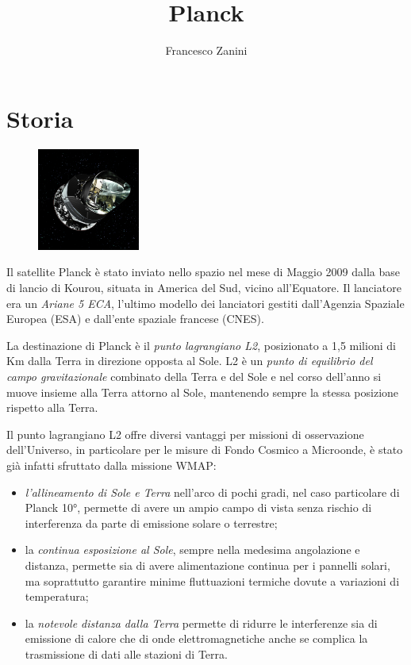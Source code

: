 \documentclass[12pt,a4paper]{article}
\begin{document}
\title{\vspace{-70pt}Planck}
\author{Francesco Zanini}
\date{}
\maketitle
\pagestyle{empty}
\thispagestyle{empty}

\section*{Storia}
\begin{figure}
  \vspace{-10pt}
  \begin{center}
    \includegraphics[width=0.30\textwidth]{satellite}
  \end{center}
  \vspace{-20pt}
\end{figure}
Il satellite Planck è stato inviato nello spazio nel mese di Maggio 2009 dalla base di lancio di Kourou, situata in America del Sud, vicino all'Equatore. Il lanciatore era un \emph{Ariane 5 ECA}, l'ultimo modello dei lanciatori gestiti dall'Agenzia Spaziale Europea (ESA) e dall'ente spaziale francese (CNES).

La destinazione di Planck è il \emph{punto lagrangiano L2}, posizionato a 1,5 milioni di Km dalla Terra in direzione opposta al Sole. L2 è un \emph{punto di equilibrio del campo gravitazionale} combinato della Terra e del Sole e nel corso dell'anno si muove insieme alla Terra attorno al Sole, mantenendo sempre la stessa posizione rispetto alla Terra.

Il punto lagrangiano L2 offre diversi vantaggi per missioni di osservazione dell'Universo, in particolare per le misure di Fondo Cosmico a Microonde, è stato già infatti sfruttato dalla missione WMAP:
\begin{itemize}
\item \emph{l'allineamento di Sole e Terra} nell'arco di pochi gradi, nel caso particolare di Planck 10°, permette di avere un ampio campo di vista senza rischio di interferenza da parte di emissione solare o terrestre;
\item la \emph{continua esposizione al Sole}, sempre nella medesima angolazione e distanza, permette sia di avere alimentazione continua per i pannelli solari, ma soprattutto garantire minime fluttuazioni termiche dovute a variazioni di temperatura;
\item la \emph{notevole distanza dalla Terra} permette di ridurre le interferenze sia di emissione di calore che di onde elettromagnetiche anche se complica la trasmissione di dati alle stazioni di Terra.
\end{itemize}
\end{document}
